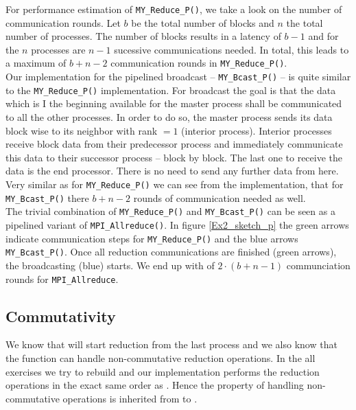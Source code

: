 For performance estimation of \texttt{MY\_Reduce\_P()}, we take a look on the number of communication rounds. Let $b$ 
be the total number of blocks and $n$ the total number of processes. The number of blocks results in a latency of $b-1$ 
and for the $n$ processes are $n-1$ sucessive communications needed. In total, this leads to a maximum of $b+n-2$ 
communication rounds in \texttt{MY\_Reduce\_P()}. \\

Our implementation for the pipelined broadcast -- \texttt{MY\_Bcast\_P()} -- is quite similar to the 
\texttt{MY\_Reduce\_P()} implementation. For broadcast the goal is that the data which is I the beginning 
available for the master process shall be communicated to all the other processes. In order to do so, the master 
process sends its data block wise to its neighbor with rank $=1$ (interior process). Interior processes receive block 
data from their predecessor process and immediately communicate this data to their successor process -- block by 
block. The last one to receive the data is the end processor. There is no need to send any further data from here.\\

Very similar as for \texttt{MY\_Reduce\_P()} we can see from the implementation, that for \texttt{MY\_Bcast\_P()} 
there $b+n-2$ rounds of communication needed as well. \\

The trivial combination of \texttt{MY\_Reduce\_P()} and \texttt{MY\_Bcast\_P()} can be seen as a pipelined variant 
of \texttt{MPI\_Allreduce()}. In figure \ref{Ex2_sketch_p} the green arrows indicate communication steps for 
\texttt{MY\_Reduce\_P()} and the blue arrows \texttt{MY\_Bcast\_P()}. Once all reduction communications
are finished (green arrows), the broadcasting (blue) starts. We end up with of $2\cdot(b+n-1)$ communciation 
rounds for \texttt{MPI\_Allreduce}.

\pagebreak

\subsection*{Commutativity}

We know that  will start reduction from the last process and we 
also know that the function can handle non-commutative reduction operations.
In the all exercises we try to rebuild  and our implementation 
performs the reduction operations in the exact same order as . Hence the property of handling
non-commutative operations is inherited from  to .


